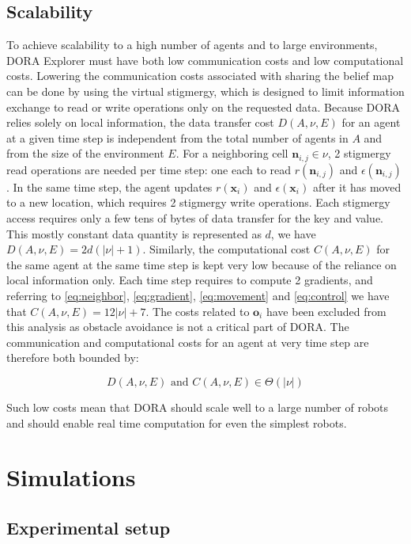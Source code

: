 \documentclass[letterpaper, 10 pt, conference]{ieeeconf}
\begin{document}
\subsection{Scalability}
\label{subsec:scalability}
To achieve scalability to a high number of agents and to large
environments, DORA Explorer must have both low communication costs and
low computational costs. Lowering the communication costs associated
with sharing the belief map can be done by using the virtual
stigmergy, which is designed to limit information exchange to read or
write operations only on the requested data. Because DORA relies
solely on local information, the data transfer cost $D(A, \nu, E)$ for
an agent at a given time step is independent from the total number of
agents in $A$ and from the size of the environment $E$. For a
neighboring cell $\bm{n}_{i,j} \in \nu$, 2 stigmergy read operations
are needed per time step: one each to read $r(\bm{n}_{i,j})$ and
$\epsilon(\bm{n}_{i,j})$. In the same time step, the agent updates
$r(\bm{x}_i)$ and $\epsilon(\bm{x}_i)$ after it has moved to a new
location, which requires 2 stigmergy write operations. Each stigmergy
access requires only a few tens of bytes of data transfer for the key
and value. This mostly constant data quantity is represented as $d$,
we have $D(A, \nu, E) = 2d(|\nu| + 1)$. Similarly, the computational
cost $C(A, \nu, E)$ for the same agent at the same time step is kept
very low because of the reliance on local information only. Each time
step requires to compute 2 gradients, and referring to
\eqref{eq:neighbor}, \eqref{eq:gradient}, \eqref{eq:movement} and
\eqref{eq:control} we have that $C(A, \nu, E) = 12|\nu|+7$. The costs
related to $\bm{o}_i$ have been excluded from this analysis as
obstacle avoidance is not a critical part of DORA. The communication
and computational costs for an agent at very time step are therefore
both bounded by:

\begin{equation}
    D(A, \nu, E) \text{ and } C(A, \nu, E) \in \Theta(|\nu|)
    \label{eq:costs}
\end{equation}

Such low costs mean that DORA should scale well to a large number of
robots and should enable real time computation for even the simplest
robots.


\section{Simulations}
\subsection{Experimental setup}
\end{document}
